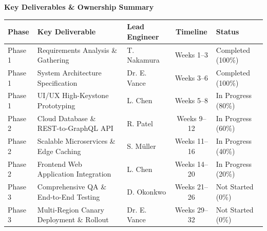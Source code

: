 \documentclass[a4paper,landscape]{article}
\begin{document}
\vspace{4mm}

{\fontsize{12}{14}\selectfont\bfseries\color{accent} Key Deliverables \& Ownership Summary}
\vspace{2mm}

\renewcommand{\arraystretch}{1.2}
\begin{tabularx}{\linewidth}{@{} l X l c l @{}}
  \toprule
  \textbf{Phase} & \textbf{Key Deliverable} & \textbf{Lead Engineer} & \textbf{Timeline} & \textbf{Status} \\
  \midrule
  Phase 1 & Requirements Analysis \& Gathering & T. Nakamura & Weeks 1--3 & Completed (100\%) \\
  Phase 1 & System Architecture Specification & Dr. E. Vance & Weeks 3--6 & Completed (100\%) \\
  Phase 1 & UI/UX High-Keystone Prototyping & L. Chen & Weeks 5--8 & In Progress (80\%) \\
  Phase 2 & Cloud Database \& REST-to-GraphQL API & R. Patel & Weeks 9--12 & In Progress (60\%) \\
  Phase 2 & Scalable Microservices \& Edge Caching & S. Müller & Weeks 11--16 & In Progress (40\%) \\
  Phase 2 & Frontend Web Application Integration & L. Chen & Weeks 14--20 & In Progress (20\%) \\
  Phase 3 & Comprehensive QA \& End-to-End Testing & D. Okonkwo & Weeks 21--26 & Not Started (0\%) \\
  Phase 3 & Multi-Region Canary Deployment \& Rollout & Dr. E. Vance & Weeks 29--32 & Not Started (0\%) \\
  \bottomrule
\end{tabularx}
\end{document}
